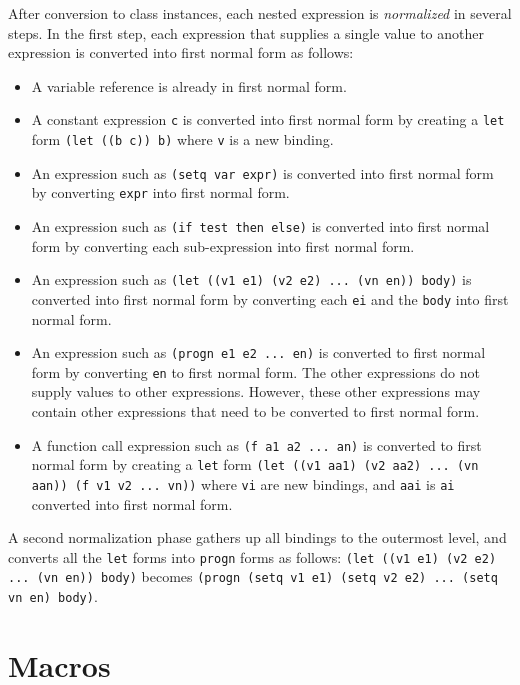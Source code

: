 \documentclass{article}
\begin{document}
After conversion to class instances, each nested expression is
\emph{normalized} in several steps.  In the first step, each
expression that supplies a single value to another expression is
converted into first normal form as follows:

\begin{itemize}
\item A variable reference is already in first normal form.
\item A constant expression \texttt{c} is converted into first normal
  form by creating a \texttt{let} form \texttt{(let ((b c)) b)} where
  \texttt{v} is a new binding. 
\item An expression such as \texttt{(setq var expr)} is converted into
  first normal form by converting \texttt{expr} into first normal
  form.
\item An expression such as \texttt{(if test then else)} is converted
  into first normal form by converting each sub-expression into first
  normal form.
\item An expression such as \texttt{(let ((v1 e1) (v2 e2) ... (vn en))
  body)} is converted into first normal form by converting each
  \texttt{ei} and the \texttt{body} into first normal form.
\item An expression such as \texttt{(progn e1 e2 ... en)} is converted
  to first normal form by converting \texttt{en} to first normal
  form.  The other expressions do not supply values to other
  expressions.  However, these other expressions may contain other
  expressions that need to be converted to first normal form.
\item A function call expression such as \texttt{(f a1 a2 ... an)} is
  converted to first normal form by creating a \texttt{let} form
  \texttt{(let ((v1 aa1) (v2 aa2) ... (vn aan)) (f v1 v2 ... vn))}
  where \texttt{vi} are new bindings, and \texttt{aai} is \texttt{ai}
  converted into first normal form.
\end{itemize}

A second normalization phase gathers up all bindings to the outermost
level, and converts all the \texttt{let} forms into \texttt{progn}
forms as follows: \texttt{(let ((v1 e1) (v2 e2) ... (vn en)) body)}
becomes \texttt{(progn (setq v1 e1) (setq v2 e2) ... (setq vn en)
  body)}.




\section{Macros}
\end{document}
